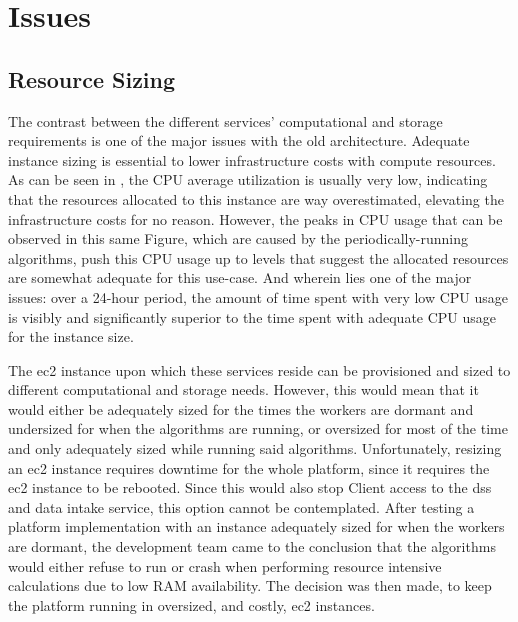 \section{Issues}\label{methodology:s:issues}

\subsection{Resource Sizing}\label{methodology:ss:resource sizing}



The contrast between the different services' computational and storage requirements is one of the major issues with the old architecture. Adequate instance sizing is essential to lower infrastructure costs with compute resources. As can be seen in , the CPU average utilization is usually very low, indicating that the resources allocated to this instance are way overestimated, elevating the infrastructure costs for no reason. However, the peaks in CPU usage that can be observed in this same Figure, which are caused by the periodically-running algorithms, push this CPU usage up to levels that suggest the allocated resources are somewhat adequate for this use-case. And wherein lies one of the major issues: over a 24-hour period, the amount of time spent with very low CPU usage is visibly and significantly superior to the time spent with adequate CPU usage for the instance size. 

The \gls{ec2} instance upon which these services reside can be provisioned and sized to different computational and storage needs. However, this would mean that it would either be adequately sized for the times the workers are dormant and undersized for when the algorithms are running, or oversized for most of the time and only adequately sized while running said algorithms. Unfortunately, resizing an \gls{ec2} instance requires downtime for the whole platform, since it requires the \gls{ec2} instance to be rebooted. Since this would also stop Client access to the \gls{dss} and data intake service, this option cannot be contemplated. After testing a platform implementation with an instance adequately sized for when the workers are dormant, the development team came to the conclusion that the algorithms would either refuse to run or crash when performing resource intensive calculations due to low RAM availability. The decision was then made, to keep the platform running in oversized, and costly, \gls{ec2} instances.

